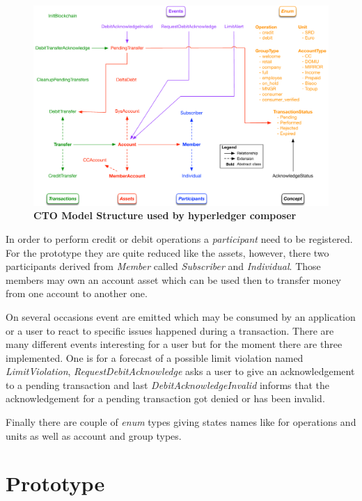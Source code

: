 \begin{figure}[htbp]
  \centering
  \includegraphics[width=1.0\textwidth]{Figures/cto-model}
  \caption{\bf\small CTO Model Structure used by hyperledger composer}
  \label{fig:prototype-net}
\end{figure}

In order to perform credit or debit operations a \textit{participant} need to be registered. For the prototype they are quite reduced like the assets, however, there two participants derived from \textit{Member} called \textit{Subscriber} and \textit{Individual}. Those members may own an account asset which can be used then to transfer money from one account to another one.

On several occasions event are emitted which may be consumed by an application or a user to react to specific issues happened during a transaction. There are many different events interesting for a user but for the moment there are three implemented. One is for a forecast of a possible limit violation named \textit{LimitViolation}, \textit{RequestDebitAcknowledge} asks a user to give an acknowledgement to a pending transaction and last \textit{DebitAcknowledgeInvalid} informs that the acknowledgement for a pending transaction got denied or has been invalid.

Finally there are couple of \textit{enum} types giving states names like for operations and units as well as account and group types.

\section{Prototype}
\label{sec:prototype}


